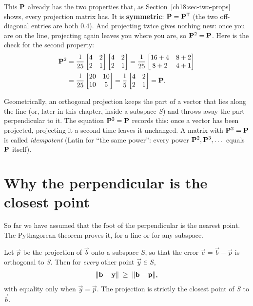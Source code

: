 This $\mathbf{P}$ already has the two properties that, as Section~\ref{ch18:sec-two-props} shows,
every projection matrix has. It is \textbf{symmetric}: $\mathbf{P}=\mathbf{P}^{\mathsf{T}}$ (the two off-diagonal
entries are both $0.4$). And projecting twice gives nothing new: once you are on the line,
projecting again leaves you where you are, so $\mathbf{P}^2=\mathbf{P}$. Here is the check for the
second property:
\begin{align*}
  \mathbf{P}^2 &= \frac{1}{25}\begin{bmatrix}4&2\\2&1\end{bmatrix}\begin{bmatrix}4&2\\2&1\end{bmatrix}
             = \frac{1}{25}\begin{bmatrix}16+4 & 8+2\\ 8+2 & 4+1\end{bmatrix}\\
            &= \frac{1}{25}\begin{bmatrix}20&10\\10&5\end{bmatrix}
             = \frac{1}{5}\begin{bmatrix}4&2\\2&1\end{bmatrix} = \mathbf{P}.
\end{align*}

\begin{aestheticbox}
Geometrically, an orthogonal projection keeps the part of a vector that lies along the line (or,
later in this chapter, inside a subspace $S$) and throws away the part perpendicular to it. The
equation $\mathbf{P}^2 = \mathbf{P}$ records this: once a vector has been projected, projecting it a
second time leaves it unchanged. A matrix with $\mathbf{P}^2 = \mathbf{P}$ is called \emph{idempotent}
(Latin for ``the same power'': every power $\mathbf{P}^2,\mathbf{P}^3,\dots$ equals $\mathbf{P}$ itself).
\end{aestheticbox}

\section{Why the perpendicular is the closest point}

So far we have assumed that the foot of the perpendicular is the nearest point. The Pythagorean
theorem proves it, for a line or for any subspace.

\begin{theorem}\label{ch18:closest-thm}
Let $\vec{p}$ be the projection of $\vec{b}$ onto a subspace $S$, so that the error
$\vec{e}=\vec{b}-\vec{p}$ is orthogonal to $S$. Then for \emph{every} other point $\vec{y}\in S$,
\[
  \lVert\mathbf{b}-\mathbf{y}\rVert \;\ge\; \lVert\mathbf{b}-\mathbf{p}\rVert,
\]
with equality only when $\vec{y}=\vec{p}$. The projection is strictly the closest point of $S$ to
$\vec{b}$.
\end{theorem}


